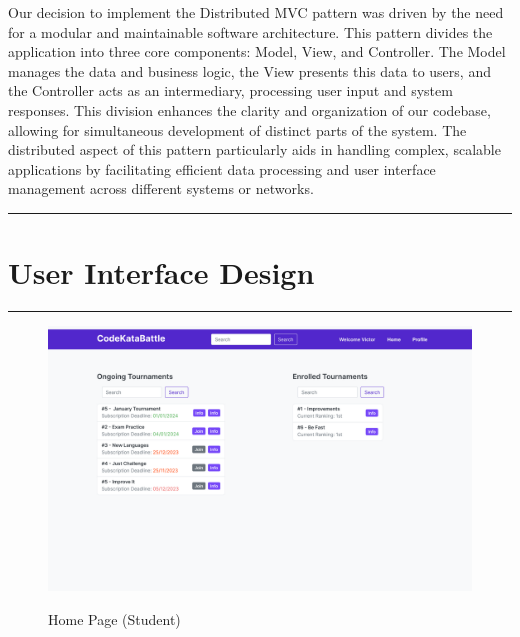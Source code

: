 \documentclass{Configuration_Files/Template}
\begin{document}
Our decision to implement the Distributed MVC pattern was driven by the need for a modular and maintainable software architecture. This pattern divides the application into three core components: Model, View, and Controller. The Model manages the data and business logic, the View presents this data to users, and the Controller acts as an intermediary, processing user input and system responses. This division enhances the clarity and organization of our codebase, allowing for simultaneous development of distinct parts of the system. The distributed aspect of this pattern particularly aids in handling complex, scalable applications by facilitating efficient data processing and user interface management across different systems or networks.

{\color{bluepoli}\rule{\linewidth}{0.1pt}}

\chapter{User Interface Design}

{\color{bluepoli}\rule{\linewidth}{0.1pt}}

\begin{figure}[H]
\centering
\includegraphics[scale = 0.25]{Images/UI/MainPage_Student.png}\\
\caption{Home Page (Student)}
\end{figure}
\end{document}
